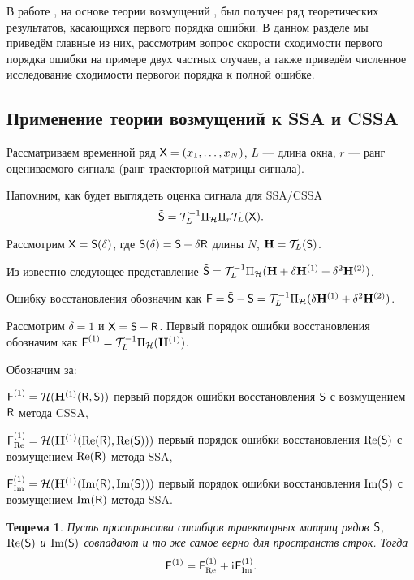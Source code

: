 \documentclass[specialist,
               substylefile = spbu.rtx,
               subf,href,colorlinks=true, 12pt]{disser}
\newtheorem{theorem}{Теорема}
\begin{document}
В работе \cite{SenBach}, на основе теории возмущений \cite{Kato}, был получен ряд теоретических результатов, касающихся первого порядка ошибки. В данном разделе мы приведём главные из них, рассмотрим вопрос скорости сходимости первого порядка ошибки на примере двух частных случаев, а также приведём численное исследование сходимости первогои порядка к полной ошибке.

\subsection{Применение теории возмущений к SSA и CSSA}

Рассматриваем временной ряд $\textsf{X}=(x_1, \ldots, x_{N})$, $L$ --- длина окна, $r$ --- ранг оцениваемого сигнала (ранг траекторной матрицы сигнала).

Напомним, как будет выглядеть оценка сигнала для SSA/CSSA
	\begin{equation*}
		\tilde{\textsf{S}} = \mathcal{T}^{-1}_{L} \Pi_{\mathcal{H}} \Pi_{r} \mathcal{T}_L (\textsf{X}).
	\end{equation*}

Рассмотрим $\textsf{X} = \textsf{S}(\delta)$, где $\textsf{S}(\delta) = \textsf{S} + \delta \textsf{R}$ длины $N$, $\mathbf{H} = \mathcal{T}_L(\textsf{S})$.

Из \cite{Nekr2008} известно следующее представление $\tilde{\textsf{S}} = \mathcal{T}_L^{-1} \Pi_{\mathcal{H}} (\mathbf{H} + \delta\mathbf{H}^{(1)} + \delta^2\mathbf{H}^{(2)})$.

Ошибку восстановления обозначим как $\textsf{F} = \tilde{\textsf{S}} - \textsf{S} = \mathcal{T}_L^{-1} \Pi_{\mathcal{H}} (\delta\mathbf{H}^{(1)} + \delta^2\mathbf{H}^{(2)})$.

Рассмотрим $\delta = 1$ и $\textsf{X} = \textsf{S} + \textsf{R}$. Первый порядок ошибки восстановления обозначим как $\textsf{F}^{(1)} = \mathcal{T}_L^{-1} \Pi_{\mathcal{H}}(\mathbf{H}^{(1)})$.

Обозначим за:

$\textsf{F}^{(1)} = \mathcal{H}(\mathbf{H}^{(1)}(\textsf{R}, \textsf{S}))$ первый порядок ошибки восстановления $\textsf{S}$ с возмущением $\textsf{R}$ метода CSSA,

$\textsf{F}^{(1)}_{\Re} = \mathcal{H}(\mathbf{H}^{(1)}(\Re(\textsf{R}), \Re(\textsf{S})))$ первый порядок ошибки восстановления $\Re(\textsf{S})$ с возмущением $\Re(\textsf{R})$ метода SSA,

$\textsf{F}^{(1)}_{\Im} = \mathcal{H}(\mathbf{H}^{(1)}(\Im(\textsf{R}), \Im(\textsf{S})))$ первый порядок ошибки восстановления $\Im(\textsf{S})$ с возмущением $\Im(\textsf{R})$ метода SSA.


\begin{theorem}\label{th:sum}
	Пусть пространства столбцов траекторных матриц рядов $\textsf{S}$, $\Re(\textsf{S})$ и $\Im(\textsf{S})$ совпадают и то же самое верно для пространств строк.
	Тогда $$\textsf{F}^{(1)} = \textsf{F}^{(1)}_{\Re} + \mathrm{i}\mkern1mu\textsf{F}^{(1)}_{\Im}.$$
\end{theorem}
\end{document}
